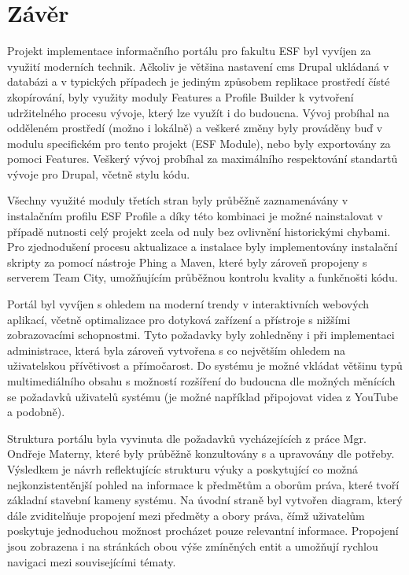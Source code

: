 \chapter{Závěr}

Projekt implementace informačního portálu pro fakultu ESF byl vyvíjen za využití moderních technik. Ačkoliv je většina nastavení \gls{cms} Drupal ukládaná v databázi a v typických případech je jediným způsobem replikace prostředí čísté zkopírování, byly využity moduly Features a Profile Builder k vytvoření udržitelného procesu vývoje, který lze využít i do budoucna. Vývoj probíhal na odděleném prostředí (možno i lokálně) a veškeré změny byly prováděny buď v modulu specifickém pro tento projekt (ESF Module), nebo byly exportovány za pomoci Features. Veškerý vývoj probíhal za maximálního respektování standartů vývoje pro Drupal, včetně stylu kódu. 

Všechny využité moduly třetích stran byly průběžně zaznamenávány v instalačním profilu ESF Profile a díky této kombinaci je možné nainstalovat v případě nutnosti celý projekt zcela od nuly bez ovlivnění historickými chybami. Pro zjednodušení procesu aktualizace a instalace byly implementovány instalační skripty za pomocí nástroje Phing a Maven, které byly zároveň propojeny s %
serverem Team City, umožňujícím průběžnou kontrolu kvality a funkčnošti kódu.

Portál byl vyvíjen s ohledem na moderní trendy v interaktivních webových aplikací, včetně optimalizace pro dotyková zařízení a přístroje s nižšími zobrazovacími schopnostmi. Tyto požadavky byly zohledněny i při implementaci administrace, která byla zároveň vytvořena s co největším ohledem na uživatelskou přívětivost a přímočarost. Do systému je možné vkládat většinu typů multimediálního obsahu s možností rozšíření do budoucna dle možných měnících se požadavků uživatelů systému (je možné například připojovat videa z YouTube a podobně).

Struktura portálu byla vyvinuta dle požadavků vycházejících z práce Mgr. Ondřeje Materny, které byly průběžně konzultovány s %
a upravovány dle potřeby. Výsledkem je návrh reflektujícíc strukturu výuky a poskytující co možná nejkonzistentěnjší pohled na informace k předmětům a oborům práva, které tvoří základní stavební kameny systému. Na úvodní straně byl vytvořen diagram, který dále zviditelňuje propojení mezi předměty a obory práva, čímž uživatelům poskytuje jednoduchou možnost procházet pouze relevantní informace. Propojení jsou zobrazena i na stránkách obou výše zmíněných entit a umožňují rychlou navigaci mezi souvisejícími tématy. 

